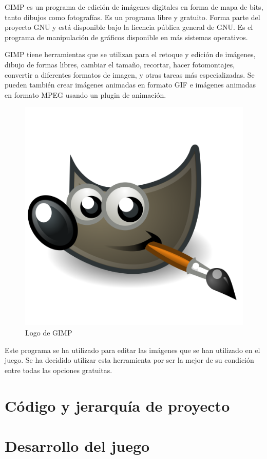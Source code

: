 		GIMP es un programa de edición de imágenes digitales en forma de mapa de bits, tanto dibujos como fotografías. Es un programa libre y gratuito. Forma parte del proyecto GNU y está disponible bajo la licencia pública general de GNU. Es el programa de manipulación de gráficos disponible en más sistemas operativos.

		GIMP tiene herramientas que se utilizan para el retoque y edición de imágenes, dibujo de formas libres, cambiar el tamaño, recortar, hacer fotomontajes, convertir a diferentes formatos de imagen, y otras tareas más especializadas. Se pueden también crear imágenes animadas en formato GIF e imágenes animadas en formato MPEG usando un plugin de animación.

		\begin{figure}[!htp]
			 \centering
			 \includegraphics{fig/gimp}
			 \caption{Logo de GIMP}
			 \label{fig:gimp}
		\end{figure}

		Este programa se ha utilizado para editar las imágenes que se han utilizado en el juego. Se ha decidido utilizar esta herramienta por ser la mejor de su condición entre todas las opciones gratuitas.

\section{Código y jerarquía de proyecto}

\section{Desarrollo del juego}